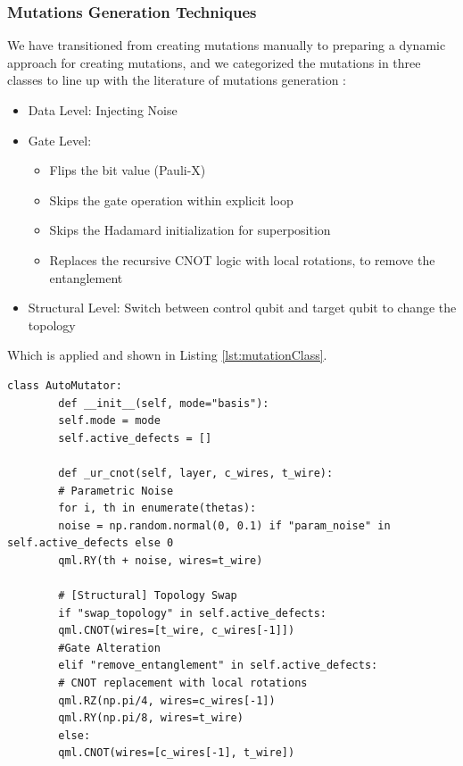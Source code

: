 \documentclass[12pt,a4paper]{article}
\begin{document}
	\subsubsection{Mutations Generation Techniques}
	
	We have transitioned from creating mutations manually to preparing a dynamic approach for creating mutations, and we categorized the mutations in three classes to line up with the literature of mutations generation \cite{9844849, qMutphyFortunato}:
	
	\begin{itemize}
		\item Data Level: Injecting Noise
		\item Gate Level: 
			\begin{itemize}
				\item  Flips the bit value (Pauli-X)
				\item Skips the gate operation within explicit loop
				\item Skips the Hadamard initialization for superposition
				\item Replaces the recursive CNOT logic with local rotations, to remove the entanglement
			\end{itemize}

		\item Structural Level: Switch between control qubit and target qubit to change the topology
		
	\end{itemize}
	
	
	 Which is applied and shown in Listing \ref{lst:mutationClass}.
	
	\begin{lstlisting}[caption=Dynamic Mutator Sample, label={lst:mutationClass}]
		class AutoMutator:
		def __init__(self, mode="basis"):
		self.mode = mode
		self.active_defects = [] 
		
		def _ur_cnot(self, layer, c_wires, t_wire):
		# Parametric Noise
		for i, th in enumerate(thetas):
		noise = np.random.normal(0, 0.1) if "param_noise" in self.active_defects else 0
		qml.RY(th + noise, wires=t_wire)
		
		# [Structural] Topology Swap
		if "swap_topology" in self.active_defects:
		qml.CNOT(wires=[t_wire, c_wires[-1]])
		#Gate Alteration
		elif "remove_entanglement" in self.active_defects:
		# CNOT replacement with local rotations
		qml.RZ(np.pi/4, wires=c_wires[-1]) 
		qml.RY(np.pi/8, wires=t_wire)
		else:
		qml.CNOT(wires=[c_wires[-1], t_wire])
	\end{lstlisting}
	
\end{document}
